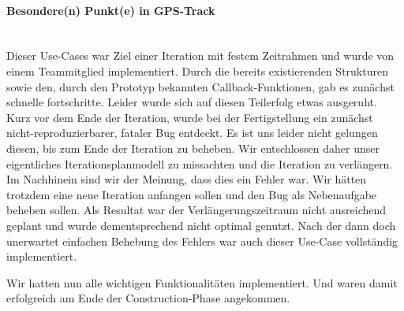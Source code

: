 \documentclass[10pt]{article}
\begin{document}
\paragraph{Besondere(n) Punkt(e) in GPS-Track} \quad\\
Dieser Use-Cases war Ziel einer Iteration mit festem Zeitrahmen und wurde von einem Teammitglied implementiert.
Durch die bereits existierenden Strukturen sowie den, durch den Prototyp bekannten Callback-Funktionen,
gab es zunächst schnelle fortschritte. Leider wurde sich auf diesen Teilerfolg etwas ausgeruht. 
Kurz vor dem Ende der Iteration, wurde bei der Fertigstellung ein zunächst nicht-reproduzierbarer, fataler Bug entdeckt.
Es ist uns leider nicht gelungen diesen, bis zum Ende der Iteration zu beheben. Wir entschlossen daher
unser eigentliches Iterationsplanmodell zu missachten und die Iteration zu verlängern. Im Nachhinein sind wir 
der Meinung, dass dies ein Fehler war. Wir hätten trotzdem eine neue Iteration anfangen sollen und den Bug als 
Nebenaufgabe beheben sollen. Als Resultat war der Verlängerungszeitraum nicht ausreichend geplant und wurde dementsprechend
nicht optimal genutzt. Nach der dann doch unerwartet einfachen Behebung des Fehlers war auch dieser Use-Case 
vollständig implementiert.\par 
\bigskip
Wir hatten nun alle wichtigen Funktionalitäten implementiert. Und waren damit erfolgreich am Ende der Construction-Phase 
angekommen.
\end{document}
